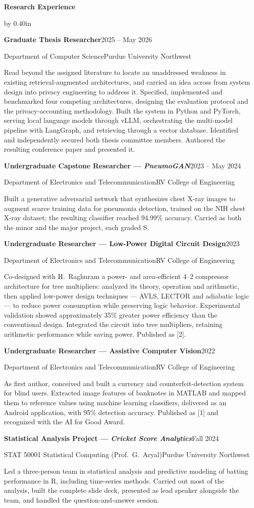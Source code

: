 \documentclass[10pt]{article}
\newcommand{\cvsection}[1]{%
  \vspace{8pt}%
  {\fontsize{11pt}{13pt}\selectfont\textbf{#1}}%
  \par\nobreak\vspace{4pt}%
}
\newenvironment{cvindent}{\par\advance\leftskip by 0.40in}{\par}
\newcommand{\cvrow}[2]{\noindent #1\hfill #2\par}
\newcommand{\cvdesc}[1]{\par #1\par\vspace{5.5pt}}
\begin{document}
\cvsection{Research Experience}
\begin{cvindent}

\cvrow{\textbf{Graduate Thesis Researcher}}{2025 -- May 2026}
\cvrow{Department of Computer Science}{Purdue University Northwest}
\cvdesc{Read beyond the assigned literature to locate an unaddressed weakness in existing
retrieval-augmented architectures, and carried an idea across from system design into privacy
engineering to address it. Specified, implemented and benchmarked four competing architectures,
designing the evaluation protocol and the privacy-accounting methodology. Built the system in Python and PyTorch, serving local language models through vLLM, orchestrating the multi-model pipeline with LangGraph, and retrieving through a vector database. Identified
and independently secured both thesis committee members. Authored the resulting conference paper and
presented it.}

\cvrow{\textbf{Undergraduate Capstone Researcher --- \emph{PneumoGAN}}}{2023 -- May 2024}
\cvrow{Department of Electronics and Telecommunication}{RV College of Engineering}
\cvdesc{Built a generative adversarial network that synthesizes chest X-ray images to augment scarce training data for pneumonia detection, trained on the NIH chest X-ray dataset; the resulting classifier reached 94.99\% accuracy. Carried as both the minor and the major project, each graded S.}

\cvrow{\textbf{Undergraduate Researcher --- Low-Power Digital Circuit Design}}{2023}
\cvrow{Department of Electronics and Telecommunication}{RV College of Engineering}
\cvdesc{Co-designed with H.~Raghuram a power- and area-efficient 4--2 compressor architecture for tree multipliers: analyzed its theory, operation and arithmetic, then applied low-power design techniques --- AVLS, LECTOR and adiabatic logic --- to reduce
power consumption while preserving logic behavior. Experimental validation showed approximately 35\%
greater power efficiency than the conventional design. Integrated the circuit into tree multipliers,
retaining arithmetic performance while saving power. Published as [2].}

\cvrow{\textbf{Undergraduate Researcher --- Assistive Computer Vision}}{2022}
\cvrow{Department of Electronics and Telecommunication}{RV College of Engineering}
\cvdesc{As first author, conceived and built a currency and counterfeit-detection system for blind users. Extracted image features of
banknotes in MATLAB and mapped them to reference values using machine learning classifiers, delivered as an Android application, with 95\% detection accuracy. Published as [1] and recognized with the AI for Good Award.}

\cvrow{\textbf{Statistical Analysis Project --- \emph{Cricket Score Analytics}}}{Fall 2024}
\cvrow{STAT 50001 Statistical Computing (Prof.\ G.~Aryal)}{Purdue University Northwest}
\cvdesc{Led a three-person team in statistical analysis and predictive modeling of batting performance in R, including time-series methods. Carried out most of the analysis, built the complete slide deck, presented as lead speaker alongside the team, and handled the question-and-answer session.}
\end{cvindent}
\end{document}
